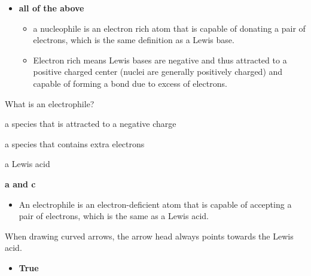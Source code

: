 \documentclass[12pt,a4paper]{article}
\begin{document}
\begin{enumerate}
        \begin{itemize}
            \item {\color{o-Sun}\textbf{all of the above}}
                \begin{itemize}
                    \item a nucleophile is an electron rich atom that is capable of {\color{o-Sun}donating a pair of electrons}, which is the same definition as a {\color{neg}Lewis base}.
                    \item Electron {\color{o-Sun}rich} means {\color{neg}Lewis bases are negative} and thus attracted to a {\color{pos}positive charged} center (nuclei are generally positively charged) and capable of forming a bond due to excess of electrons. 
                \end{itemize}
        \end{itemize}
    {\color{G-Moon}\item What is an electrophile?}
        \begin{itemize}
        {\color{G-Moon}\item[a.] a species that is attracted to a negative charge
            \item[b.] a species that contains extra electrons 
            \item[c.] a Lewis acid}
            {\color{o-Sun}\item[d.] \textbf{a and c}}
            \begin{itemize}
                \item An electrophile is an {\color{o-Sun}electron-deficient} atom that is capable of {\color{o-Sun}accepting a pair of electrons}, which is the same as a {\color{pos}Lewis acid}.
            \end{itemize}
        \end{itemize}
    \newpage
    {\color{G-Moon}\item When drawing curved arrows, the arrow head always points towards the Lewis acid.}
        \begin{itemize}
            \item {\color{o-Sun}\textbf{True}}

\end{itemize}
\end{enumerate}
\end{document}
